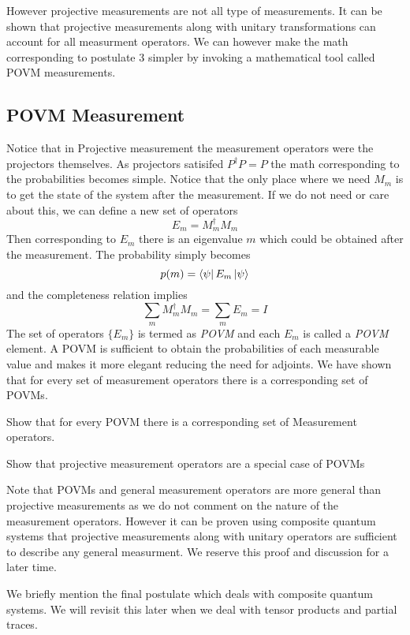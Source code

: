 However projective measurements are not all type of measurements. It can be shown that projective measurements along with unitary transformations can account for all measurment operators. We can however make the math corresponding to postulate 3 simpler by invoking a mathematical tool called POVM measurements.
\clearpage

\subsection{POVM Measurement}

Notice that in Projective measurement the measurement operators were the projectors themselves. As projectors satisifed $P^{\dagger}P = P$ the math corresponding to the probabilities becomes simple. Notice that the only place where we need $M_m$ is to get the state of the system after the measurement. If we do not need or care about this, we can define a new set of operators 
$$E_m = M_m^{\dagger}M_m $$
Then corresponding to $E_m$ there is an eigenvalue $m$ which could be obtained after the measurement. The probability simply becomes
$$p(m) = \bra{\psi}E_m\ket{\psi}$$
and the completeness relation implies 
$$ \sum_m M_m^{\dagger}M_m = \sum_m E_m = I$$
The set of operators $\{E_m\}$ is termed as \textit{POVM} and each $E_m$ is called a \textit{POVM} element. A POVM is sufficient to obtain the probabilities of each measurable value and makes it more elegant reducing the need for adjoints. We have shown that for every set of measurement operators there is a corresponding set of POVMs.

\begin{exercise}
Show that for every POVM there is a corresponding set of Measurement operators.
\end{exercise}
\begin{exercise}
Show that projective measurement operators are a special case of POVMs
\end{exercise}

Note that POVMs and general measurement operators are more general than projective measurements as we do not comment on the nature of the measurement operators. However it can be proven using composite quantum systems that projective measurements along with unitary operators are sufficient to describe any general measurment. We reserve this proof and discussion for a later time.

We briefly mention the final postulate which deals with composite quantum systems. We will revisit this later when we deal with tensor products and partial traces.


